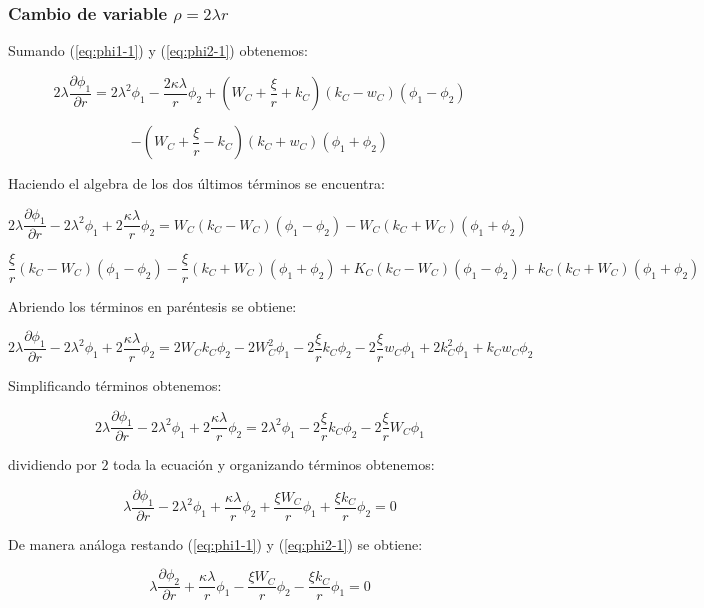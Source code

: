 \documentclass[a4paper, 12pt]{article} %
\begin{document}
 
\subsubsection{Cambio de variable $\rho=2\lambda r$} 

Sumando  (\ref{eq:phi1-1}) y  (\ref{eq:phi2-1}) obtenemos:

\[
2 \lambda \dfrac{\partial \phi_1}{\partial r} = 2 \lambda^2  \phi_1 
- \dfrac{2 \kappa \lambda }{r}\phi_2 + \left( W_C + \dfrac{\xi}{r} + k_C  \right ) 
(k_C - w_C)(\phi_1 - \phi_2) 
\]

\[
- \left( W_C + \dfrac{\xi}{r} - k_C  \right )(k_C + w_C)(\phi_1 + \phi_2) 
\]

Haciendo el algebra de los dos \'ultimos t\'erminos se encuentra:

\[
2 \lambda \dfrac{\partial \phi_1}{\partial r} -  2 \lambda^2  \phi_1 + 2\dfrac{\kappa \lambda}{r}\phi_2
= W_C(k_C - W_C)(\phi_1 - \phi_2) - W_C(k_C + W_C)(\phi_1 + \phi_2)
\]

\[
\dfrac{\xi}{r}(k_C - W_C)(\phi_1 - \phi_2) - \dfrac{\xi}{r}(k_C + W_C)(\phi_1 + \phi_2)
+ K_C (k_C - W_C)(\phi_1 - \phi_2) + k_C (k_C + W_C)(\phi_1 + \phi_2)
\]

Abriendo los t\'erminos en par\'entesis se obtiene:

\[
2 \lambda \dfrac{\partial \phi_1}{\partial r} -  2 \lambda^2  \phi_1 + 2\dfrac{\kappa \lambda}{r}\phi_2
= 2W_Ck_C\phi_2 - 2W_C^2 \phi_1 - 2 \dfrac{\xi}{r}k_C \phi_2 - 2 \dfrac{\xi}{r}w_C \phi_1 
+ 2 k_C^2 \phi_1  + k_C w_C \phi_2
\]

Simplificando t\'erminos obtenemos:

\[
 2 \lambda \dfrac{\partial \phi_1}{\partial r} -  2 \lambda^2  \phi_1 + 2\dfrac{\kappa \lambda}{r}\phi_2
= 2\lambda^2 \phi_1 - 2 \dfrac{\xi}{r}k_C \phi_2 - 2\dfrac{\xi}{r}W_C \phi_1
\]

dividiendo por $2$ toda la ecuaci\'on y organizando t\'erminos obtenemos:

\begin{equation}
\lambda \dfrac{\partial \phi_1}{\partial r} - 2 \lambda^2 \phi_1 + \dfrac{\kappa \lambda}{r} \phi_2  + \dfrac{\xi W_C}{r} \phi_1 
+ \dfrac{\xi k_C}{r}\phi_2 = 0
\end{equation}

De manera an\'aloga restando (\ref{eq:phi1-1}) y  (\ref{eq:phi2-1}) se obtiene:

\begin{equation}
\lambda \dfrac{\partial \phi_2}{\partial r}  + \dfrac{\kappa \lambda}{r} \phi_1  - \dfrac{\xi W_C}{r} \phi_2 - \dfrac{\xi k_C}{r} \phi_1 = 0
\end{equation}
\end{document}
